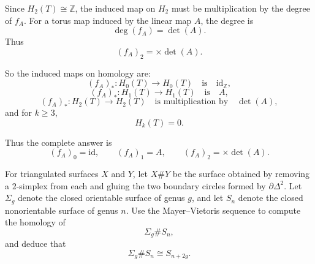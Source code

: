 \begin{solution}
Since \(H_2(T)\cong \mathbb Z\), the induced map on \(H_2\) must be multiplication by the degree of \(f_A\). For a torus map induced by the linear map \(A\), the degree is
\[
\deg(f_A)=\det(A).
\]
Thus
\[
(f_A)_2=\times \det(A).
\]

So the induced maps on homology are:
\[
(f_A)_*:H_0(T)\to H_0(T)
\quad\text{is}\quad
\mathrm{id}_{\mathbb Z},
\]
\[
(f_A)_*:H_1(T)\to H_1(T)
\quad\text{is}\quad
A,
\]
\[
(f_A)_*:H_2(T)\to H_2(T)
\quad\text{is multiplication by}\quad
\det(A),
\]
and for \(k\ge 3\),
\[
H_k(T)=0.
\]

Thus the complete answer is
\[
(f_A)_0=\mathrm{id},\qquad
(f_A)_1=A,\qquad
(f_A)_2=\times \det(A).
\]
\end{solution}

\begin{problem}
For triangulated surfaces \(X\) and \(Y\), let \(X\#Y\) be the surface obtained by removing a \(2\)-simplex from each and gluing the two boundary circles formed by \(\partial\Delta^2\). Let \(\Sigma_g\) denote the closed orientable surface of genus \(g\), and let \(S_n\) denote the closed nonorientable surface of genus \(n\). Use the Mayer--Vietoris sequence to compute the homology of
\[
\Sigma_g\# S_n,
\]
and deduce that
\[
\Sigma_g\# S_n\cong S_{n+2g}.
\]

\par
\end{problem}

